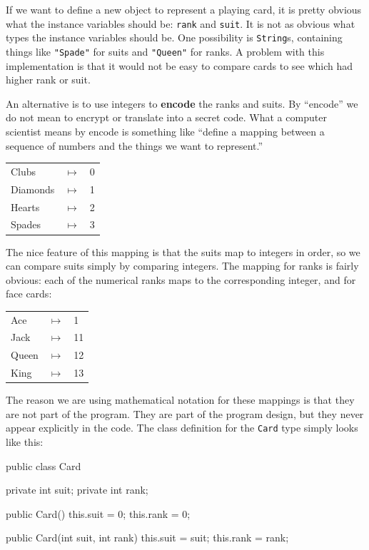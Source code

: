 \documentclass[12pt]{book}
\theoremstyle{exercise}
\newcommand{\java}[1]{\lstinline{#1}} %
\begin{document}
If we want to define a new object to represent a playing card, it is pretty obvious what the instance variables should be: \java{rank} and \java{suit}.
It is not as obvious what types the instance variables should be.
One possibility is \java{String}s, containing things like \java{"Spade"} for suits and \java{"Queen"} for ranks.
A problem with this implementation is that it would not be easy to compare cards to see which had higher rank or suit.


An alternative is to use integers to {\bf encode} the ranks and suits.
By ``encode'' we do not mean to encrypt or translate into a secret code.
What a computer scientist means by encode is something like ``define a mapping between a sequence of numbers and the things we want to represent.''

\begin{tabular}{l c l}
Clubs & $\mapsto$ & 0 \\
Diamonds & $\mapsto$ & 1 \\
Hearts & $\mapsto$ & 2 \\
Spades & $\mapsto$ & 3
\end{tabular}

The nice feature of this mapping is that the suits map to integers in order, so we can compare suits simply by comparing integers.
The mapping for ranks is fairly obvious: each of the numerical ranks maps to the corresponding integer, and for face cards:

\begin{tabular}{l c l}
Ace & $\mapsto$ & 1 \\
Jack & $\mapsto$ & 11 \\
Queen & $\mapsto$ & 12 \\
King & $\mapsto$ & 13 \\
\end{tabular}

The reason we are using mathematical notation for these mappings is that they are not part of the program.
They are part of the program design, but they never appear explicitly in the code.
The class definition for the \java{Card} type simply looks like this:

\begin{code}
public class Card {
    private int suit;
    private int rank;

    public Card() {
        this.suit = 0;
        this.rank = 0;
    }

    public Card(int suit, int rank) {
        this.suit = suit;
        this.rank = rank;
    }
}
\end{code}
\end{document}
